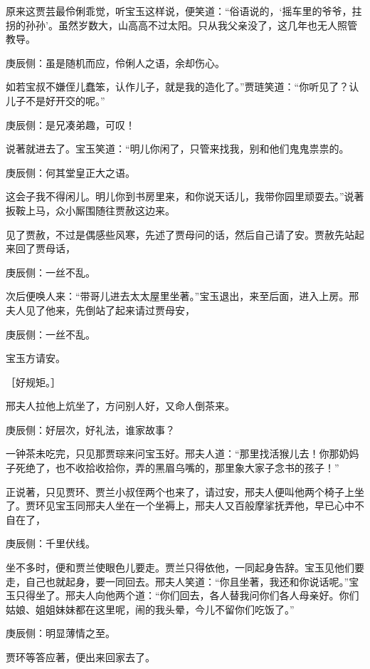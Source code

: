 \begin{parag}
    原来这贾芸最伶俐乖觉，听宝玉这样说，便笑道：“俗语说的，‘摇车里的爷爷，拄拐的孙孙’。虽然岁数大，山高高不过太阳。只从我父亲没了，这几年也无人照管教导。\begin{note}庚辰侧：虽是随机而应，伶俐人之语，余却伤心。\end{note}如若宝叔不嫌侄儿蠢笨，认作儿子，就是我的造化了。”贾琏笑道：“你听见了？认儿子不是好开交的呢。”\begin{note}庚辰侧：是兄凑弟趣，可叹！\end{note}说著就进去了。宝玉笑道：“明儿你闲了，只管来找我，别和他们鬼鬼祟祟的。\begin{note}庚辰侧：何其堂皇正大之语。\end{note}这会子我不得闲儿。明儿你到书房里来，和你说天话儿，我带你园里顽耍去。”说著扳鞍上马，众小厮围随往贾赦这边来。
\end{parag}


\begin{parag}
    见了贾赦，不过是偶感些风寒，先述了贾母问的话，然后自己请了安。贾赦先站起来回了贾母话，\begin{note}庚辰侧：一丝不乱。\end{note}次后便唤人来：“带哥儿进去太太屋里坐著。”宝玉退出，来至后面，进入上房。邢夫人见了他来，先倒站了起来请过贾母安，\begin{note}庚辰侧：一丝不乱。\end{note}宝玉方请安。\begin{note}［好规矩。］\end{note}邢夫人拉他上炕坐了，方问别人好，又命人倒茶来。\begin{note}庚辰侧：好层次，好礼法，谁家故事？\end{note}一钟茶未吃完，只见那贾琮来问宝玉好。邢夫人道：“那里找活猴儿去！你那奶妈子死绝了，也不收拾收拾你，弄的黑眉乌嘴的，那里象大家子念书的孩子！”
\end{parag}


\begin{parag}
    正说著，只见贾环、贾兰小叔侄两个也来了，请过安，邢夫人便叫他两个椅子上坐了。贾环见宝玉同邢夫人坐在一个坐褥上，邢夫人又百般摩挲抚弄他，早已心中不自在了，\begin{note}庚辰侧：千里伏线。\end{note}坐不多时，便和贾兰使眼色儿要走。贾兰只得依他，一同起身告辞。宝玉见他们要走，自己也就起身，要一同回去。邢夫人笑道：“你且坐著，我还和你说话呢。”宝玉只得坐了。邢夫人向他两个道：“你们回去，各人替我问你们各人母亲好。你们姑娘、姐姐妹妹都在这里呢，闹的我头晕，今儿不留你们吃饭了。”\begin{note}庚辰侧：明显薄情之至。\end{note}贾环等答应著，便出来回家去了。
\end{parag}


